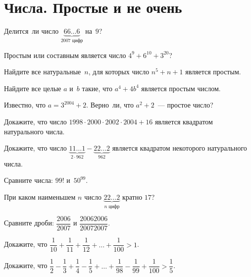 
\section*{Числа. Простые и не очень}


\begin{problems}

\item
Делится~ли число
\(
    \underbrace{66 {\ldots} 6}_{\text{$2007$ цифр}}
\)
на~$9$?

\item
Простым или составным является число $4^{9} + 6^{10} + 3^{20}$?

\item
Найдите все натуральные~$n$, для которых число $n^5 + n + 1$ является простым.

\item
Найдите все целые $a$ и~$b$ такие, что $a^4 + 4 b^4$ является простым числом.

\item
Известно, что $a = 3^{2004} + 2$.
Верно~ли, что $a^2 + 2$~--- простое число?

\item
Докажите, что число $1998 \cdot 2000 \cdot 2002 \cdot 2004 + 16$ является
квадратом натурального числа.

\item
Докажите, что число
\(
    \underbrace{11 {\ldots} 1}_{2 \cdot 962}
    -
    \underbrace{22 {\ldots} 2}_{962}
\)
является квадратом некоторого натурального числа.

\item
Сравните числа: $99!$ и~$50^{99}$.

\item
При каком наименьшем $n$ число
\(
    \underbrace{22 {\ldots} 2}_{\text{$n$ цифр}}
\)
кратно $17$?

\item
Сравните дроби:\enspace
$\dfrac{2006}{2007}$\enspace
и\enspace
$\dfrac{20062006}{20072007}$.

\item
Докажите, что\enspace
\(
    \dfrac{1}{10} + \dfrac{1}{11} + \dfrac{1}{12}
    + \ldots +
    \dfrac{1}{100}
>
    1
\).

\item
Докажите, что\enspace
\(
    \dfrac{1}{2} - \dfrac{1}{3} + \dfrac{1}{4} - \dfrac{1}{5}
    + \ldots +
    \dfrac{1}{98} - \dfrac{1}{99} + \dfrac{1}{100}
>
    \dfrac{1}{5}
\).

\end{problems}

